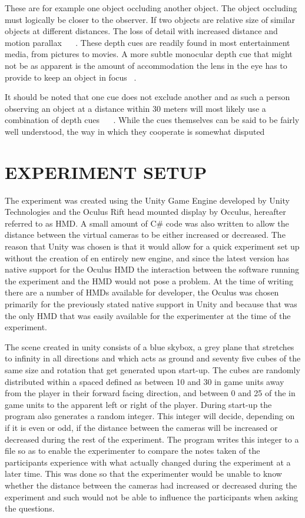 \documentclass[tog]{acmsiggraph}
\begin{document}
These are for example one object occluding another object. The object occluding must logically be closer to the observer. If two objects are relative size of similar objects at different distances. The loss of detail with increased distance and motion parallax ~\cite {Pfautz:2002:DPCG}  ~\cite {Kemeny:2003:DPDSE}. These depth cues are readily found in most entertainment media, from pictures to movies. A more subtle monocular depth cue that might not be as apparent is the amount of accommodation the lens in the eye has to provide to keep an object in focus ~\cite{Pfautz:2002:DPCG}. 


It should be noted that one cue does not exclude another and as such a person observing an object at a distance within 30 meters will most likely use a combination of depth cues ~\cite {Boyd:2000:DPC}  ~\cite {Pfautz:2002:DPCG}. While the cues themselves can be said to be fairly well understood, the way in which they cooperate is somewhat disputed ~\cite {Boyd:2000:DPC} 

\section{EXPERIMENT SETUP}

The experiment was created using the Unity Game Engine developed by Unity Technologies and the Oculus Rift head mounted display by Occulus, hereafter referred to as HMD. A small amount of C\# code was also written to allow the distance between the virtual cameras to be either increased or decreased. The reason that Unity was chosen is that it would allow for a quick experiment set up without the creation of en entirely new engine, and since the latest version has native support for the Oculus HMD the interaction between the software running the experiment and the HMD would not pose a problem.
At the time of writing there are a number of HMDs available for developer, the Oculus was chosen primarily for the previously stated native support in Unity and because that was the only HMD that was easily available for the experimenter at the time of the experiment.

The scene created in unity consists of a blue skybox, a grey plane that stretches to infinity in all directions and which acts as ground and seventy five cubes of the same size and rotation that get generated upon start-up. The cubes are randomly distributed within a spaced defined as between 10 and 30 in game units away from the player in their forward facing direction, and between 0 and 25 of the in game units to the apparent left or right of the player. During start-up the program also generates a random integer. This integer will decide, depending on if it is even or odd, if the distance between the cameras will be increased or decreased during the rest of the experiment. The program writes this integer to a file so as to enable the experimenter to compare the notes taken of the participants experience with what actually changed during the experiment at a later time. This was done so that the experimenter would be unable to know whether the distance between the cameras had increased or decreased during the experiment and such would not be able to influence the participants when asking the questions. 
\end{document}
